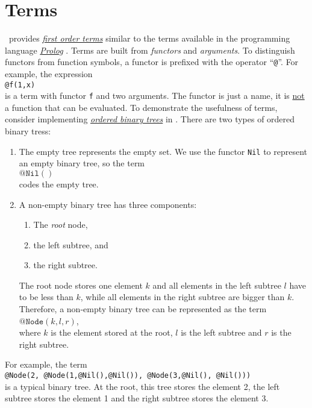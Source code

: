 \section{Terms}
\setlx\ provides 
\href{http://en.wikipedia.org/wiki/Term_(first-order_logic)#Terms}{\emph{first order terms}}
similar to the terms available in the programming language 
\href{http://en.wikipedia.org/wiki/Prolog}{\emph{Prolog}} \cite{sterling:94}.
Terms are built from \emph{functors} and \emph{arguments}.  To distinguish functors from function
symbols, a functor is prefixed with the operator ``\texttt{@}''.  For example, the expression
\\[0.2cm]
\hspace*{1.3cm}
\texttt{@f(1,x)}
\\[0.2cm]
is a term with functor \texttt{f} and two arguments.  The functor is just a name, it is 
\underline{not} a function that can be evaluated.  To demonstrate the usefulness of terms, consider
implementing \href{http://en.wikipedia.org/wiki/Binary_search_tree}{\emph{ordered binary trees}} in \setlx. 
There are two types of ordered binary tress:
\begin{enumerate}
\item The empty tree represents the empty set.  We use the functor \texttt{Nil} to represent an
      empty binary tree, so the term
      \\[0.2cm]
      \hspace*{1.3cm}
      $\mathtt{@Nil()}$
      \\[0.2cm]
      codes the empty tree.
\item A non-empty binary tree has three components:
      \begin{enumerate}
      \item The \emph{root} node,
      \item the left subtree, and
      \item the right subtree.
      \end{enumerate}
      The root node stores one element $k$ and all elements in the left subtree $l$ have to be less
      than $k$, while all elements in the right subtree are bigger than $k$.  Therefore, a non-empty
      binary tree can be represented as the term
      \\[0.2cm]
      \hspace*{1.3cm}
      $\texttt{@Node}(k, l, r)$,
      \\[0.2cm]
      where $k$ is the element stored at the root, $l$ is the left subtree and $r$ is the right subtree.
\end{enumerate}
For example, the term
\\[0.2cm]
\hspace*{1.3cm}
\texttt{@Node(2, @Node(1,@Nil(),@Nil()), @Node(3,@Nil(), @Nil()))}
\\[0.2cm]
is a typical binary tree.  At the root, this tree stores the element 2, the left subtree
stores the element 1 and the right subtree stores the element 3.

